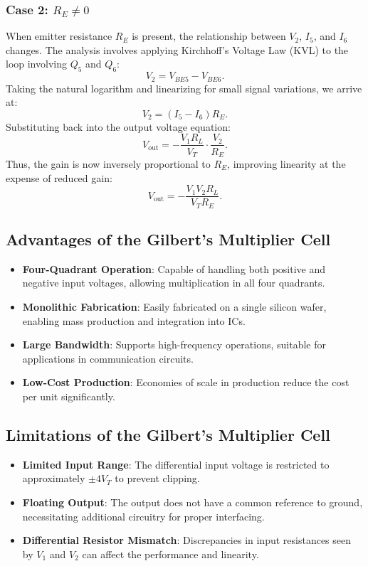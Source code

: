 \documentclass[a4paper,9pt,twoside,openany,twocolumn]{memoir}
\begin{document}
\subsubsection{Case 2: $R_E \neq 0$}
When emitter resistance $R_E$ is present, the relationship between $V_2$, $I_5$, and $I_6$ changes. The analysis involves applying Kirchhoff's Voltage Law (KVL) to the loop involving $Q_5$ and $Q_6$:
\[
V_2 = V_{BE5} - V_{BE6}.
\]
Taking the natural logarithm and linearizing for small signal variations, we arrive at:
\[
V_2 = (I_5 - I_6) R_E.
\]
Substituting back into the output voltage equation:
\[
V_{\text{out}} = -\frac{V_1 R_L}{V_T} \cdot \frac{V_2}{R_E}.
\]
Thus, the gain is now inversely proportional to $R_E$, improving linearity at the expense of reduced gain:
\[
V_{\text{out}} = -\frac{V_1 V_2 R_L}{V_T R_E}.
\]

\subsection{Advantages of the Gilbert's Multiplier Cell}
\begin{itemize}
    \item \textbf{Four-Quadrant Operation}: Capable of handling both positive and negative input voltages, allowing multiplication in all four quadrants.
    \item \textbf{Monolithic Fabrication}: Easily fabricated on a single silicon wafer, enabling mass production and integration into ICs.
    \item \textbf{Large Bandwidth}: Supports high-frequency operations, suitable for applications in communication circuits.
    \item \textbf{Low-Cost Production}: Economies of scale in production reduce the cost per unit significantly.
\end{itemize}

\subsection{Limitations of the Gilbert's Multiplier Cell}
\begin{itemize}
    \item \textbf{Limited Input Range}: The differential input voltage is restricted to approximately $\pm 4V_T$ to prevent clipping.
    \item \textbf{Floating Output}: The output does not have a common reference to ground, necessitating additional circuitry for proper interfacing.
    \item \textbf{Differential Resistor Mismatch}: Discrepancies in input resistances seen by $V_1$ and $V_2$ can affect the performance and linearity.
\end{itemize}
\end{document}
